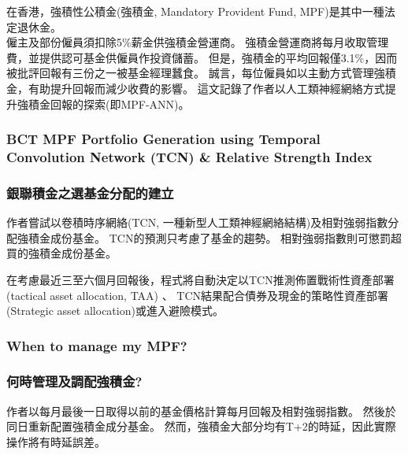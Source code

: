 \documentclass[
]{article}
\begin{document}
在香港，強積性公積金(強積金, Mandatory Provident Fund,
MPF)是其中一種法定退休金。\\
僱主及部份僱員須扣除5\%薪金供強積金營運商。
強積金營運商將每月收取管理費，並提供認可基金供僱員作投資儲蓄。
但是，強積金的平均回報僅3.1\%，因而被批評回報有三份之一被基金經理蠶食。
誠言，每位僱員如以主動方式管理強積金，有助提升回報而減少收費的影響。
這文記錄了作者以人工類神經網絡方式提升強積金回報的探索(即MPF-ANN)。

\hypertarget{bct-mpf-portfolio-generation-using-temporal-convolution-network-tcn-relative-strength-index}{%
\subsubsection{BCT MPF Portfolio Generation using Temporal Convolution
Network (TCN) \& Relative Strength
Index}\label{bct-mpf-portfolio-generation-using-temporal-convolution-network-tcn-relative-strength-index}}

\hypertarget{ux9280ux806fux7a4dux91d1ux4e4bux9078ux57faux91d1ux5206ux914dux7684ux5efaux7acb}{%
\subsubsection{銀聯積金之選基金分配的建立}\label{ux9280ux806fux7a4dux91d1ux4e4bux9078ux57faux91d1ux5206ux914dux7684ux5efaux7acb}}

作者嘗試以卷積時序網絡(TCN,
一種新型人工類神經網絡結構)及相對強弱指數分配強積金成份基金。
TCN的預測只考慮了基金的趨勢。 相對強弱指數則可懲罰超買的強積金成份基金。

在考慮最近三至六個月回報後，程式將自動決定以TCN推測佈置戰術性資產部署(tactical
asset allocation, TAA) 、
TCN結果配合債券及現金的策略性資產部署(Strategic asset
allocation)或進入避險模式。

\hypertarget{when-to-manage-my-mpf}{%
\subsubsection{When to manage my MPF?}\label{when-to-manage-my-mpf}}

\hypertarget{ux4f55ux6642ux7ba1ux7406ux53caux8abfux914dux5f37ux7a4dux91d1}{%
\subsubsection{何時管理及調配強積金?}\label{ux4f55ux6642ux7ba1ux7406ux53caux8abfux914dux5f37ux7a4dux91d1}}

作者以每月最後一日取得以前的基金價格計算每月回報及相對強弱指數。
然後於同日重新配置強積金成分基金。
然而，強積金大部分均有T+2的時延，因此實際操作將有時延誤差。
\end{document}
